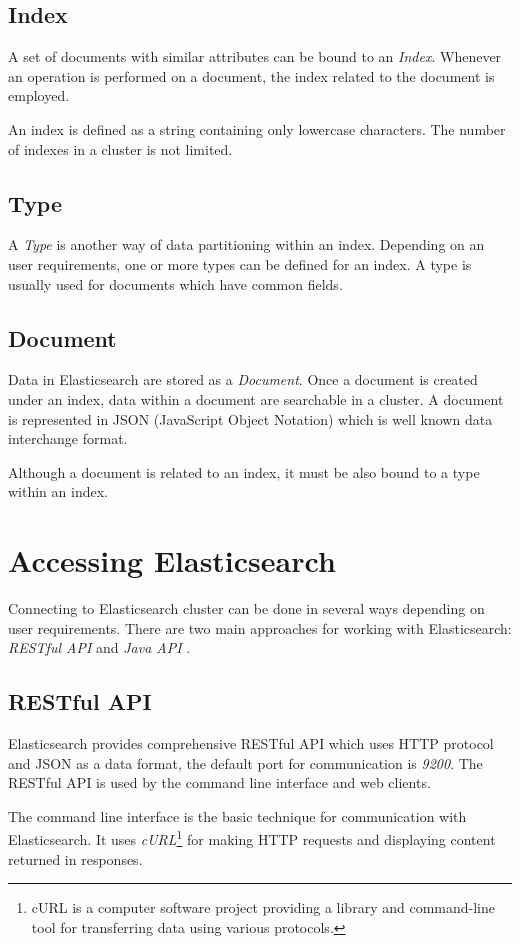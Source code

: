 \documentclass[12pt,oneside]{fithesis2}
\begin{document}
\subsection{Index}
A set of documents with similar attributes can be bound to an \textit{Index}. Whenever an operation is performed on a document, the index related to the document is employed.

An index is defined as a string containing only lowercase characters. The number of indexes in a cluster is not limited.

\subsection{Type}
A \textit{Type} is another way of data partitioning within an index. Depending on an user requirements, one or more types can be defined for an index. A type is usually used for documents which have common fields.

\subsection{Document}
Data in Elasticsearch are stored as a \textit{Document}. Once a document is created under an index, data within a document are searchable in a cluster. A document is represented in JSON (JavaScript Object Notation) which is well known data interchange format.

Although a document is related to an index, it must be also bound to a type within an index.

\section{Accessing Elasticsearch}
Connecting to Elasticsearch cluster can be done in several ways depending on user requirements. There are two main approaches for working with Elasticsearch: \textit{RESTful API} and \textit{Java API} \cite[Talking to Elasticsearch]{elasticsearch_defnitive_guide}.

\subsection{RESTful API}
Elasticsearch provides comprehensive RESTful API which uses HTTP protocol and JSON as a data format, the default port for communication is \textit{9200}. The RESTful API is used by the command line interface and web clients.

The command line interface is the basic technique for communication with Elasticsearch. It uses \textit{cURL}\footnote{cURL is a computer software project providing a library and command-line tool for transferring data using various protocols.} for making HTTP requests and displaying content returned in responses.
\end{document}
